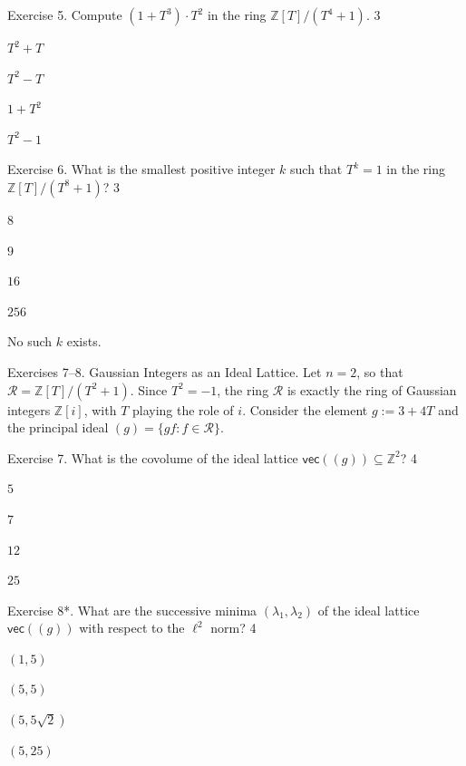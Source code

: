 \documentclass[../../book.tex]{subfiles}
\begin{document}
\begin{xexercise}
    {Exercise 5.}
    {Compute $(1 + T^3) \cdot T^2$ in the ring $\mathbb{Z}[T]/(T^4+1)$.}
    {3}
    {
        \item $T^2 + T$
        \item $T^2 - T$
        \item $1 + T^2$
        \item $T^2 - 1$
    }
\end{xexercise}
 
\begin{xexercise}
    {Exercise 6.}
    {What is the smallest positive integer $k$ such that $T^k = 1$ in the ring $\mathbb{Z}[T]/(T^8+1)$?}
    {3}
    {
        \item $8$
        \item $9$
        \item $16$
        \item $256$
        \item No such $k$ exists.
    }
\end{xexercise}
 
\begin{exbox}{Exercises 7--8. Gaussian Integers as an Ideal Lattice.}
    Let $n = 2$, so that $\mathcal{R} = \mathbb{Z}[T]/(T^2+1)$.
    Since $T^2 = -1$, the ring $\mathcal{R}$ is exactly the ring of Gaussian integers $\mathbb{Z}[i]$, with $T$ playing the role of $i$.
    Consider the element $g := 3+4T$ and the principal ideal $(g) = \{gf: f \in \mathcal{R}\}$.
\end{exbox}
 
\begin{xexercise}
    {Exercise 7.}
    {What is the covolume of the ideal lattice $\mathsf{vec}((g)) \subseteq \mathbb{Z}^2$?}
    {4}
    {
        \item $5$
        \item $7$
        \item $12$
        \item $25$
    }
\end{xexercise}
 
\begin{xexercise}
    {Exercise 8*.}
    {What are the successive minima $(\lambda_1, \lambda_2)$ of the ideal lattice $\mathsf{vec}((g))$ with respect to the $\ell^2$ norm?}
    {4}
    {
        \item $(1, 5)$
        \item $(5, 5)$
        \item $(5, 5\sqrt{2})$
        \item $(5, 25)$
    }
\end{xexercise}
 
\end{document}
